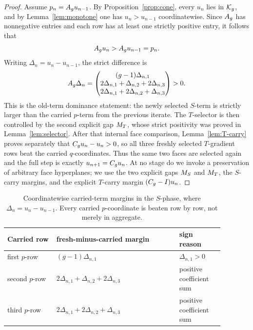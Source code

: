 \documentclass[11pt]{article}
\theoremstyle{remark}
\numberwithin{equation}{section}
\begin{document}
\begin{proof}
Assume \(p_n=A_g u_{n-1}\).  By Proposition~\ref{prop:cone}, every \(u_n\) lies
in \(\mathcal{K}_g\), and by Lemma~\ref{lem:monotone} one has \(u_n>u_{n-1}\)
coordinatewise.  Since \(A_g\) has nonnegative entries and each row has at
least one strictly positive entry, it follows that
\[
A_g u_n>A_g u_{n-1}=p_n.
\]
Writing \(\Delta_n=u_n-u_{n-1}\), the strict difference is
\[
A_g\Delta_n=
\begin{pmatrix}
(g-1)\Delta_{n,1}\\
2\Delta_{n,1}+\Delta_{n,2}+2\Delta_{n,3}\\
2\Delta_{n,1}+2\Delta_{n,2}+\Delta_{n,3}
\end{pmatrix}
>0.
\]
This is the old-term dominance statement: the newly selected \(S\)-term is
strictly larger than the carried \(p\)-term from the previous iterate.  The
\(T\)-selector is then controlled by the second explicit gap \(M_T\), whose
strict positivity was proved in Lemma~\ref{lem:selector}.  After that internal
face comparison, Lemma~\ref{lem:T-carry} proves separately that
\(C_g u_n-u_n>0\), so all three freshly selected \(T\)-gradient rows beat the
carried \(q\)-coordinates.  Thus the same two faces are selected again and the
full step is exactly \(u_{n+1}=C_g u_n\).  At no stage do we invoke a
preservation of arbitrary face hyperplanes; we use the two explicit gaps
\(M_S\) and \(M_T\), the \(S\)-carry margins, and the explicit \(T\)-carry
margin \((C_g-I)u_n\).
\end{proof}

\begin{table}[t]
\centering
\small
\begin{tabular}{p{0.20\linewidth}p{0.50\linewidth}p{0.18\linewidth}}
\toprule
Carried row & fresh-minus-carried margin & sign reason \\
\midrule
first \(p\)-row & \((g-1)\Delta_{n,1}\) & \(\Delta_{n,1}>0\) \\
second \(p\)-row & \(2\Delta_{n,1}+\Delta_{n,2}+2\Delta_{n,3}\) & positive coefficient sum \\
third \(p\)-row & \(2\Delta_{n,1}+2\Delta_{n,2}+\Delta_{n,3}\) & positive coefficient sum \\
\bottomrule
\end{tabular}
\caption{Coordinatewise carried-term margins in the \(S\)-phase, where \(\Delta_n=u_n-u_{n-1}\).  Every carried \(p\)-coordinate is beaten row by row, not merely in aggregate.}
\label{tab:carry}
\end{table}
\end{document}
